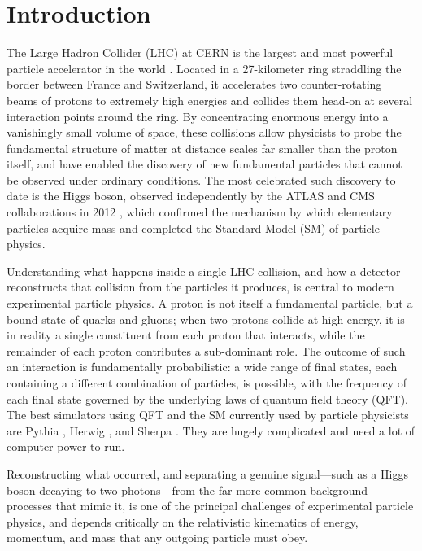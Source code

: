 \documentclass{article}
\begin{document}
\tableofcontents
\newpage

\section{Introduction}
\par The Large Hadron Collider (LHC) at CERN is the largest and most powerful particle accelerator in the world \cite{cern_lhc}. Located in a 27-kilometer ring straddling the border between France and Switzerland, it accelerates two counter-rotating beams of protons to extremely high energies and collides them head-on at several interaction points around the ring. By concentrating enormous energy into a vanishingly small volume of space, these collisions allow physicists to probe the fundamental structure of matter at distance scales far smaller than the proton itself, and have enabled the discovery of new fundamental particles that cannot be observed under ordinary conditions. The most celebrated such discovery to date is the Higgs boson, observed independently by the ATLAS and CMS collaborations in 2012 \cite{atlas_higgs, cms_higgs}, which confirmed the mechanism by which elementary particles acquire mass and completed the Standard Model (SM) of particle physics.
\par Understanding what happens inside a single LHC collision, and how a detector reconstructs that collision from the particles it produces, is central to modern experimental particle physics. A proton is not itself a fundamental particle, but a bound state of quarks and gluons; when two protons collide at high energy, it is in reality a single constituent from each proton that interacts, while the remainder of each proton contributes a sub-dominant role. The outcome of such an interaction is fundamentally probabilistic: a wide range of final states, each containing a different combination of particles, is possible, with the frequency of each final state governed by the underlying laws of quantum field theory (QFT). The best simulators using QFT and the SM currently used by particle physicists are Pythia \cite{pythia8}, Herwig \cite{herwig7}, and Sherpa \cite{sherpa3}. They are hugely complicated and need a lot of computer power to run.
\par Reconstructing what occurred, and separating a genuine signal---such as a Higgs boson decaying to two photons---from the far more common background processes that mimic it, is one of the principal challenges of experimental particle physics, and depends critically on the relativistic kinematics of energy, momentum, and mass that any outgoing particle must obey.
\end{document}
